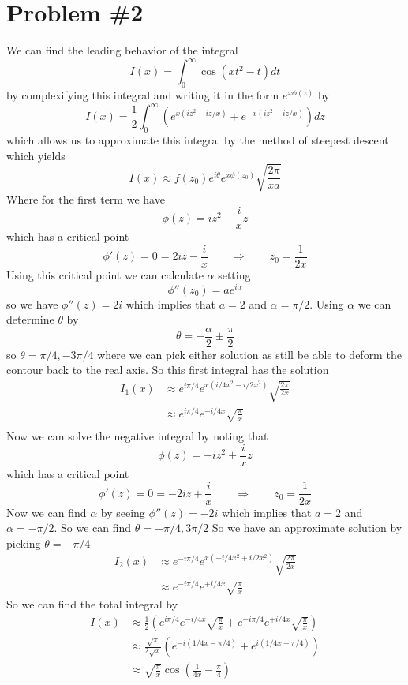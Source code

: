 \documentclass[11pt]{article}
\numberwithin{equation}{section}
\begin{document}
\section{Problem \#2}
We can find the leading behavior of the integral
$$I(x) = \int_{0}^{\infty}\cos\left(xt^2-t\right)dt$$
by complexifying this integral and writing it in the form $e^{x\phi(z)}$ by
$$I(x) = \frac{1}{2}\int_{0}^{\infty}\left(e^{x(iz^2-iz/x)}+e^{-x(iz^2-iz/x)}\right)dz$$
which allows us to approximate this integral by the method of steepest descent which yields
$$I(x) \approx f(z_0)e^{i\theta}e^{x\phi(z_0)}\sqrt{\frac{2\pi}{xa}}$$
Where for the first term we have
$$\phi(z) = iz^2-\frac{i}{x}z$$
which has a critical point
$$\phi'(z) = 0 = 2iz - \frac{i}{x} \qquad\Rightarrow\qquad z_0 = \frac{1}{2x}$$
Using this critical point we can calculate $\alpha$ setting
$$\phi''(z_0) = ae^{i\alpha}$$
so we have $\phi''(z) = 2i$ which implies that $a=2$ and $\alpha=\pi/2$. Using $\alpha$ we 
can determine $\theta$ by 
$$\theta = -\frac{\alpha}{2}\pm\frac{\pi}{2}$$
so $\theta = \pi/4,-3\pi/4$ where we can pick either solution as still be able to deform the
contour back to the real axis. So this first integral has the solution
\begin{align*}
I_1(x) &\approx e^{i\pi/4}e^{x(i/4x^2-i/2x^2)}\sqrt{\frac{2\pi}{2x}}\\
&\approx e^{i\pi/4}e^{-i/4x}\sqrt{\frac{\pi}{x}}\\
\end{align*}
Now we can solve the negative integral by noting that
$$\phi(z) = -iz^2+\frac{i}{x}z$$
which has a critical point
$$\phi'(z) = 0 = -2iz + \frac{i}{x} \qquad\Rightarrow\qquad z_0 = \frac{1}{2x}$$
Now we can find $\alpha$ by seeing $\phi''(z) = -2i$ which implies that $a=2$ and $\alpha=-\pi/2$.
So we can find $\theta = -\pi/4,3\pi/2$ So we have an approximate solution by picking 
$\theta=-\pi/4$
\begin{align*}
I_2(x) &\approx e^{-i\pi/4}e^{x(-i/4x^2+i/2x^2)}\sqrt{\frac{2\pi}{2x}}\\
&\approx e^{-i\pi/4}e^{+i/4x}\sqrt{\frac{\pi}{x}}
\end{align*}
So we can find the total integral by
\begin{align*}
I(x) &\approx \frac{1}{2}\left(e^{i\pi/4}e^{-i/4x}\sqrt{\frac{\pi}{x}} + e^{-i\pi/4}e^{+i/4x}\sqrt{\frac{\pi}{x}}\right)\\
&\approx \frac{\sqrt{\pi}}{2\sqrt{x}}\left(e^{-i(1/4x-\pi/4)} + e^{i(1/4x-\pi/4)}\right)\\
&\approx \sqrt{\frac{\pi}{x}}\cos\left(\frac{1}{4x}-\frac{\pi}{4}\right)
\end{align*}
\end{document}
